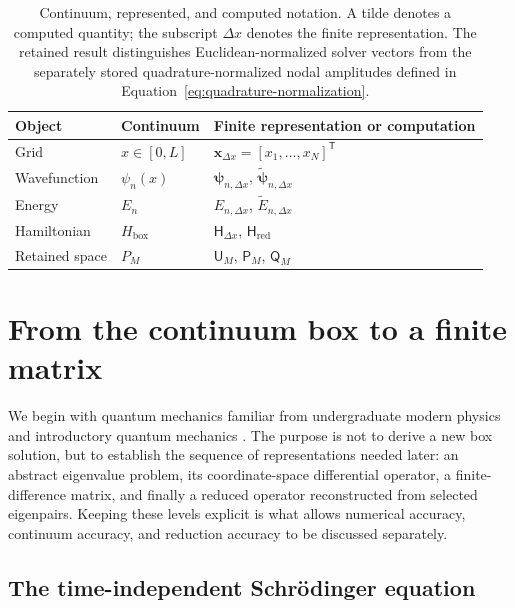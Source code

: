 \documentclass[11pt]{article}
\newcommand{\mat}[1]{\mathsf{#1}}
\newcommand{\vect}[1]{\boldsymbol{#1}}
\begin{document}
\begin{table}[!htbp]
\centering
\begin{tabular}{@{}lll@{}}
\toprule
Object & Continuum & Finite representation or computation \\
\midrule
Grid & $x\in[0,L]$ & $\vect{x}_{\Delta x}=[x_1,\ldots,x_N]^{\mathsf T}$ \\
Wavefunction & $\psi_n(x)$ & $\vect{\psi}_{n,\Delta x}$,
$\widetilde{\vect{\psi}}_{n,\Delta x}$ \\
Energy & $E_n$ & $E_{n,\Delta x}$, $\widetilde E_{n,\Delta x}$ \\
Hamiltonian & $H_{\mathrm{box}}$ & $\mat{H}_{\Delta x}$, $\mat{H}_{\mathrm{red}}$ \\
Retained space & $P_M$ & $\mat{U}_M$, $\mat{P}_M$, $\mat{Q}_M$ \\
\bottomrule
\end{tabular}
\caption{Continuum, represented, and computed notation. A tilde denotes a computed
quantity; the subscript $\Delta x$ denotes the finite representation. The retained
result distinguishes Euclidean-normalized solver vectors from the separately stored
quadrature-normalized nodal amplitudes defined in
Equation~\eqref{eq:quadrature-normalization}.}
\label{tab:notation}
\end{table}

\section{From the continuum box to a finite matrix}

We begin with quantum mechanics familiar from undergraduate modern physics and
introductory quantum mechanics \cite{beiser2003,griffithsSchroeter2018}. The purpose
is not to derive a new box solution, but to establish the sequence of representations
needed later: an abstract eigenvalue problem, its coordinate-space differential
operator, a finite-difference matrix, and finally a reduced operator reconstructed
from selected eigenpairs. Keeping these levels explicit is what allows numerical
accuracy, continuum accuracy, and reduction accuracy to be discussed separately.

\subsection{The time-independent Schr\"odinger equation}
\end{document}
